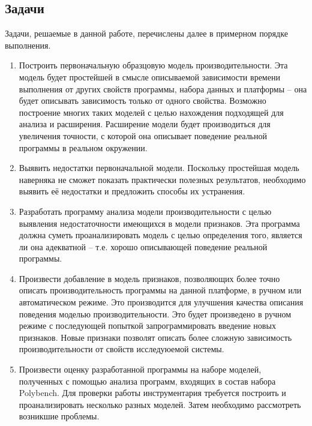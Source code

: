 \subsection*{Задачи}
%
Задачи, решаемые в данной работе, перечислены далее в примерном порядке выполнения.
\begin{enumerate}
	\item Построить первоначальную образцовую модель производительности. Эта модель будет простейшей в смысле описываемой зависимости времени выполнения от других свойств программы, набора данных и платформы -- она будет описывать зависимость только от одного свойства. Возможно построение многих таких моделей с целью нахождения подходящей для анализа и расширения. Расширение модели будет производиться для увеличения точности, с которой она описывает поведение реальной программы в реальном окружении.
	\item Выявить недостатки первоначальной модели. Поскольку простейшая модель наверняка не сможет показать практически полезных результатов, необходимо выявить её недостатки и предложить способы их устранения.
	\item Разработать программу анализа модели производительности с целью выявления недостаточности имеющихся в модели признаков. Эта программа должна суметь проанализировать модель с целью определения того, является ли она адекватной -- т.е. хорошо описывающей поведение реальной программы.
	\item Произвести добавление в модель признаков, позволяющих более точно описать производительность программы на данной платформе, в ручном или автоматическом режиме. Это производится для улучшения качества описания поведения моделью производительности. Это будет произведено в ручном режиме с последующей попыткой запрограммировать введение новых признаков. Новые признаки позволят описать более сложную зависимость производительности от свойств исследуюемой системы.
	\item Произвести оценку разработанной программы на наборе моделей, полученных с помощью анализа программ, входящих в состав набора Polybench. Для проверки работы инструментария требуется построить и проанализировать несколько разных моделей. Затем необходимо рассмотреть возникшие проблемы.
\end{enumerate}